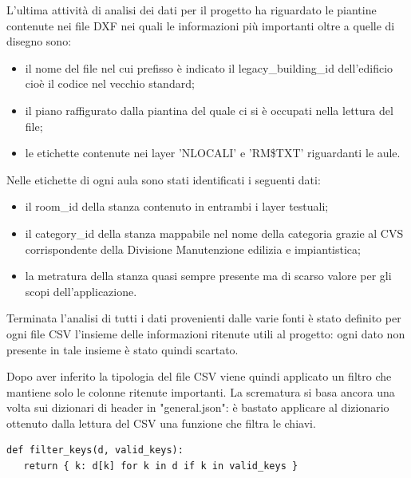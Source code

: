 \documentclass[12pt]{report}
\begin{document}
\vspace{5mm} %

L'ultima attività di analisi dei dati per il progetto ha riguardato le piantine contenute nei file DXF nei quali le informazioni più importanti oltre a quelle di disegno sono:
\begin{itemize}
\item il nome del file nel cui prefisso è indicato il legacy\_building\_id dell'edificio cioè il codice nel vecchio standard;
\item il piano raffigurato dalla piantina del quale ci si è occupati nella lettura del file;
\item le etichette contenute nei layer 'NLOCALI' e 'RM\$TXT' riguardanti le aule.
\end{itemize}  

Nelle etichette di ogni aula sono stati identificati i seguenti dati:
\begin{itemize}
\item il room\_id della stanza contenuto in entrambi i layer testuali;
\item il category\_id della stanza mappabile nel nome della categoria grazie al CVS corrispondente della Divisione Manutenzione edilizia e impiantistica;
\item la metratura della stanza quasi sempre presente ma di scarso valore per gli scopi dell'applicazione.
\end{itemize}  

\vspace{5mm} %

Terminata l'analisi di tutti i dati provenienti dalle varie fonti è stato definito per ogni file CSV l'insieme delle informazioni ritenute utili al progetto: ogni dato non presente in tale insieme è stato quindi scartato.

Dopo aver inferito la tipologia del file CSV viene quindi applicato un filtro che mantiene solo le colonne ritenute importanti. 
La scrematura si basa ancora una volta sui dizionari di header in "general.json": è bastato applicare al dizionario ottenuto dalla lettura del CSV una funzione che filtra le chiavi.
\begin{lstlisting}[label=codice,caption=Definizione della funzione filter\_keys, frame=single]
def filter_keys(d, valid_keys):
   return { k: d[k] for k in d if k in valid_keys }
\end{lstlisting}

\vspace{5mm} %
\end{document}
